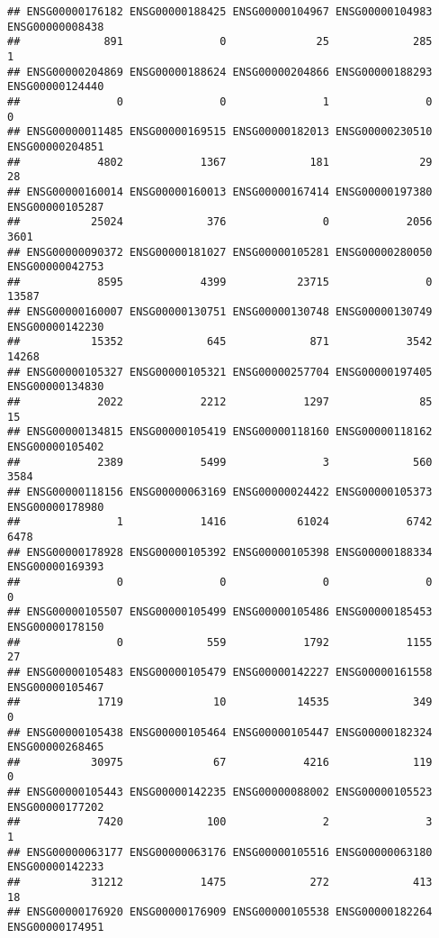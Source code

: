 \documentclass[
]{article}
\begin{document}
\begin{verbatim}
## ENSG00000176182 ENSG00000188425 ENSG00000104967 ENSG00000104983 ENSG00000008438 
##             891               0              25             285               1 
## ENSG00000204869 ENSG00000188624 ENSG00000204866 ENSG00000188293 ENSG00000124440 
##               0               0               1               0               0 
## ENSG00000011485 ENSG00000169515 ENSG00000182013 ENSG00000230510 ENSG00000204851 
##            4802            1367             181              29              28 
## ENSG00000160014 ENSG00000160013 ENSG00000167414 ENSG00000197380 ENSG00000105287 
##           25024             376               0            2056            3601 
## ENSG00000090372 ENSG00000181027 ENSG00000105281 ENSG00000280050 ENSG00000042753 
##            8595            4399           23715               0           13587 
## ENSG00000160007 ENSG00000130751 ENSG00000130748 ENSG00000130749 ENSG00000142230 
##           15352             645             871            3542           14268 
## ENSG00000105327 ENSG00000105321 ENSG00000257704 ENSG00000197405 ENSG00000134830 
##            2022            2212            1297              85              15 
## ENSG00000134815 ENSG00000105419 ENSG00000118160 ENSG00000118162 ENSG00000105402 
##            2389            5499               3             560            3584 
## ENSG00000118156 ENSG00000063169 ENSG00000024422 ENSG00000105373 ENSG00000178980 
##               1            1416           61024            6742            6478 
## ENSG00000178928 ENSG00000105392 ENSG00000105398 ENSG00000188334 ENSG00000169393 
##               0               0               0               0               0 
## ENSG00000105507 ENSG00000105499 ENSG00000105486 ENSG00000185453 ENSG00000178150 
##               0             559            1792            1155              27 
## ENSG00000105483 ENSG00000105479 ENSG00000142227 ENSG00000161558 ENSG00000105467 
##            1719              10           14535             349               0 
## ENSG00000105438 ENSG00000105464 ENSG00000105447 ENSG00000182324 ENSG00000268465 
##           30975              67            4216             119               0 
## ENSG00000105443 ENSG00000142235 ENSG00000088002 ENSG00000105523 ENSG00000177202 
##            7420             100               2               3               1 
## ENSG00000063177 ENSG00000063176 ENSG00000105516 ENSG00000063180 ENSG00000142233 
##           31212            1475             272             413              18 
## ENSG00000176920 ENSG00000176909 ENSG00000105538 ENSG00000182264 ENSG00000174951 

\end{verbatim}
\end{document}
